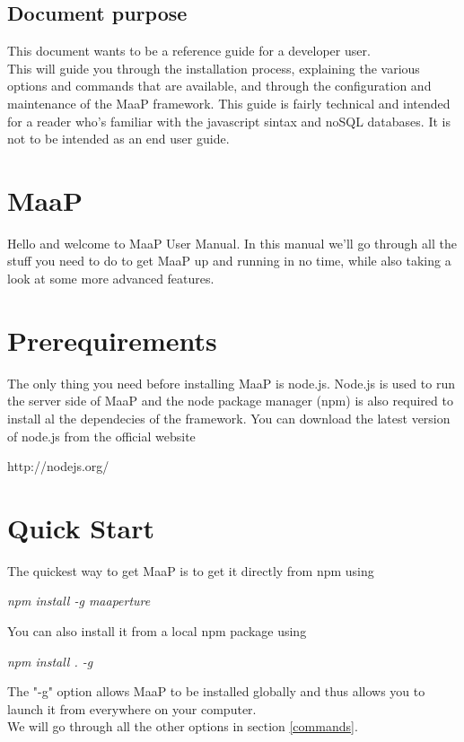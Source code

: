 \subsection{Document purpose}
This document wants to be a reference guide for a developer user. \\
This will guide you through the installation process, explaining the various options and commands that are available, and through the configuration and maintenance of the MaaP framework.
This guide is fairly technical and intended for a reader who's familiar with the javascript sintax and noSQL databases.
It is not to be intended as an end user guide.

\newpage
\section{MaaP}
Hello and welcome to MaaP User Manual.
In this manual we'll go through all the stuff you need to do to get MaaP up and running in no time, while also taking a look at some more advanced features.

\section{Prerequirements}
The only thing you need before installing MaaP is node.js.
Node.js is used to run the server side of MaaP and the node package manager (npm) is also required to install al the dependecies of the framework.
You can download the latest version of node.js from the official website
\begin{center}
http://nodejs.org/
\end{center}


\section{Quick Start}
The quickest way to get MaaP is to get it directly from npm using
\begin{center}
\textit{npm install -g maaperture}
\end{center}

You can also install it from a local npm package using 
\begin{center}
\textit{npm install . -g}
\end{center}

The "-g" option allows MaaP to be installed globally and thus allows you to launch it from everywhere on your computer.\\
We will go through all the other options in section \ref{commands}.\\

